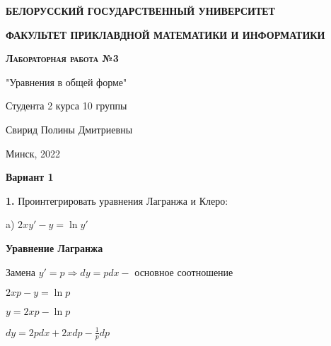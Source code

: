 \documentclass[a4paper]{article}
\begin{document}
\begin{titlepage}
  \begin{center}
    \large
    \vspace{0.5cm}
    \textbf{БЕЛОРУССКИЙ ГОСУДАРСТВЕННЫЙ УНИВЕРСИТЕТ}
    
    \textbf{ФАКУЛЬТЕТ ПРИКЛАВДНОЙ МАТЕМАТИКИ И ИНФОРМАТИКИ}
    \vspace{0.5cm}
     
    
    \vfill
     
     
    \textbf{\textsc{Лабораторная работа №3}}
    
    "Уравнения в общей форме"
    \vfill

    Студента 2 курса 10 группы
    
    Свирид Полины Дмитриевны
    \vspace{3cm}
     
     
\end{center}
\vfill
 
\begin{center}
  Минск, 2022
\end{center}
\end{titlepage}

\begin{center}
  \textbf{Вариант 1}
\end{center}

\textbf{1.} Проинтегрировать уравнения Лагранжа и Клеро:

\vspace{0.5cm}

a) $\displaystyle 2xy'-y=\ln{y'}$

\vspace{0.3cm}

\textbf{Уравнение Лагранжа}

\vspace{0.3cm}

Замена $\displaystyle y'=p \Rightarrow dy=pdx - $ основное соотношение

\vspace{0.3cm}

$\displaystyle 2xp-y=\ln{p}$

\vspace{0.3cm}

$\displaystyle y=2xp-\ln{p}$

\vspace{0.3cm}

$\displaystyle dy=2pdx+2xdp-\frac{1}{p}dp$

\vspace{0.3cm}
\end{document}

